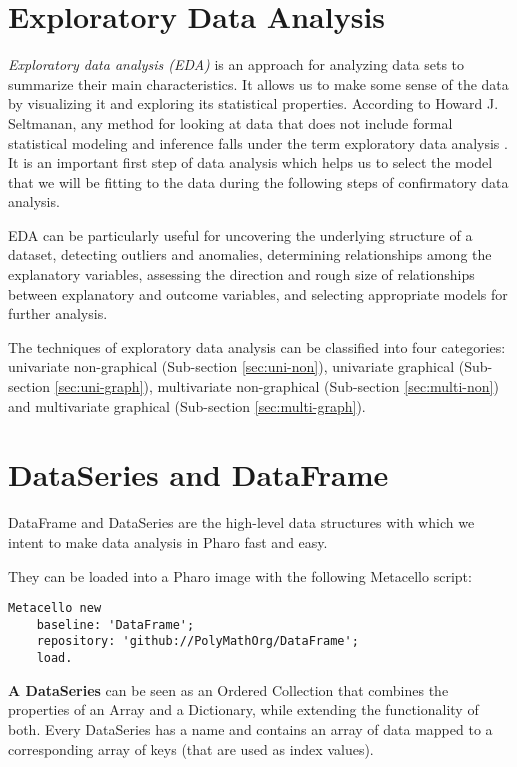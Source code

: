 \documentclass[sigplan]{acmart}
\begin{document}
\section{Exploratory Data Analysis}
\label{sec:eda}
\textit{Exploratory data analysis (EDA)} is an approach for analyzing data sets to summarize their main characteristics. It allows us to make some sense of the data by visualizing it and exploring its statistical properties. According to Howard J. Seltmanan, any method for looking at data that does not include formal statistical modeling and inference falls under the term exploratory data analysis \cite{Seltman}. It is an important first step of data analysis which helps us to select the model that we will be fitting to the data during the following steps of confirmatory data analysis.

EDA can be particularly useful for uncovering the underlying structure of a dataset, detecting outliers and anomalies, determining relationships among the explanatory variables, assessing the direction and rough size of relationships between explanatory and outcome variables, and selecting appropriate models for further analysis\cite{eStats}.

The techniques of exploratory data analysis can be classified into four categories: univariate non-graphical (Sub-section \ref{sec:uni-non}), univariate graphical (Sub-section \ref{sec:uni-graph}), multivariate non-graphical (Sub-section \ref{sec:multi-non}) and multivariate graphical (Sub-section \ref{sec:multi-graph}).

\section{DataSeries and DataFrame}
\label{sec:dataframe}
DataFrame and DataSeries are the high-level data structures with which we intent to make data analysis in Pharo fast and easy.%

They can be loaded into a Pharo image with the following Metacello script:

\begin{lstlisting}[basicstyle=\small,language=Smalltalk]
Metacello new
    baseline: 'DataFrame';
    repository: 'github://PolyMathOrg/DataFrame';
    load.
\end{lstlisting}

\textbf{A DataSeries} can be seen as an Ordered Collection that combines the properties of an Array and a Dictionary, while extending the functionality of both. Every DataSeries has a name and contains an array of data mapped to a corresponding array of keys (that are used as index values).
\end{document}
